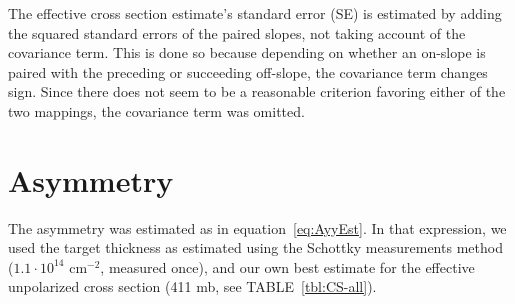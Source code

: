 \documentclass[reprint, superscriptaddress]{revtex4-1}
\begin{document}
The effective cross section estimate's standard error (SE) is estimated by adding the squared standard errors of the paired slopes, not taking account of the covariance term. This is done so because depending on whether an on-slope is paired with the preceding or succeeding off-slope, the covariance term changes sign. Since there does not seem to be a reasonable criterion favoring either of the two mappings, the covariance term was omitted.

\section{Asymmetry}

The asymmetry was estimated as in equation~\eqref{eq:AyyEst}. In that expression, we used the target thickness as estimated using the Schottky measurements method~\cite{Stein} ($1.1\cdot 10^{14}$ cm$^{-2}$, measured once), and our own best estimate for the effective unpolarized cross section (411 mb, see TABLE~\ref{tbl:CS-all}).
\end{document}
